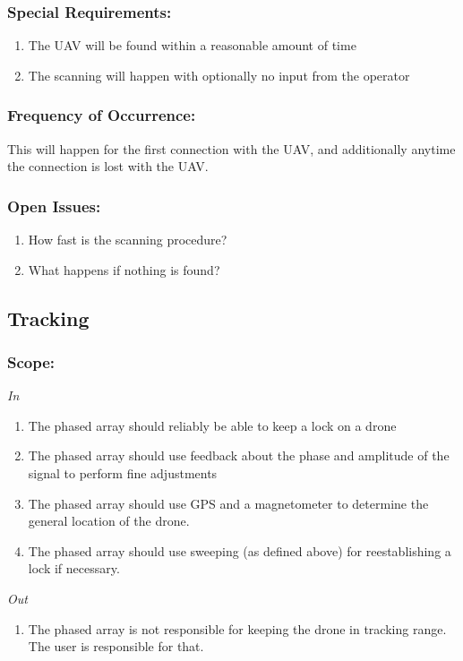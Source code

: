 \documentclass[ProductRequirements.tex]{subfiles}
\begin{document}
		\subsubsection*{Special Requirements:}
			\begin{enumerate}\itemsep1pt
				\item The UAV will be found within a reasonable amount of time
				\item The scanning will happen with optionally no input from the operator
			\end{enumerate}
		\subsubsection*{Frequency of Occurrence:}
			This will happen for the first connection with the UAV, and additionally anytime the connection is lost with the UAV.
		\subsubsection*{Open Issues:}
			\begin{enumerate}\itemsep1pt
				\item How fast is the scanning procedure?
				\item What happens if nothing is found?
			\end{enumerate}		
	
	\subsection{Tracking}
	\subsubsection*{Scope:}
	\textit{In}
	\begin{enumerate}
		\item The phased array should reliably be able to keep a lock on a drone
		\item The phased array should use feedback about the phase and amplitude of the signal to perform fine adjustments
		\item The phased array should use GPS and a magnetometer to determine the general location of the drone.
		\item The phased array should use sweeping (as defined above) for reestablishing a lock if necessary.
	\end{enumerate}
	\textit{Out}
	\begin{enumerate}
		\item The phased array is not responsible for keeping the drone in tracking range. The user is responsible for that.
	\end{enumerate}
\end{document}
